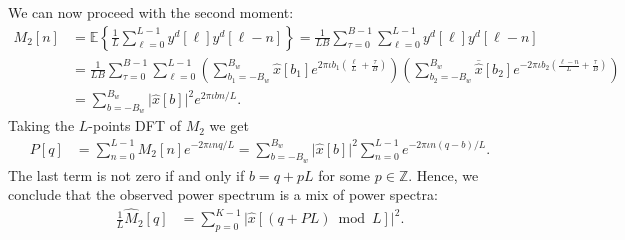\documentclass[english,12pt]{article}
\newcommand{\I}{\iota}
\newcommand{\tB}{B_w}
\newcommand{\hx}{\hat{x}}
\newcommand{\E}{\mathbb{E}}
\numberwithin{equation}{section}
\numberwithin{thm}{section} %
\begin{document}
We can now proceed with the second moment:
\begin{equation} \label{eq:ps}
\begin{split}
M_2[n] &= \E\left\{\frac{1}{L}\sum_{\ell=0}^{L-1} y^d[\ell]y^d[\ell-n]\right\} =  \frac{1}{LB}\sum_{\tau=0}^{B-1}\sum_{\ell=0}^{L-1} y^d[\ell]y^d[\ell-n] \\ &=  \frac{1}{LB}\sum_{\tau=0}^{B-1}\sum_{\ell=0}^{L-1}
\left(\sum_{b_1=-\tB}^{\tB}\hat{x}[b_1]e^{2\pi\I b_1 \left(\frac{\ell}{L} + \frac{\tau}{B}\right)} \right)
\left(\sum_{b_2=-\tB}^{\tB}\overline{\hx}[b_2]e^{-2\pi\I b_2 \left(\frac{\ell-n}{L} + \frac{\tau}{B}\right)} \right) \\
&=
\sum_{b=-\tB}^{\tB}\vert \hat{x}[b]\vert ^2e^{2\pi\I bn/L}.
\end{split}
\end{equation}
Taking the $L$-points DFT of $M_2$ we get 
\begin{equation}
\begin{split}
P[q] &= \sum_{n=0}^{L-1}M_2[n]e^{-2\pi\I nq/L} = \sum_{b=-\tB}^{\tB}\vert \hat{x}[b]\vert^2\sum_{n=0}^{L-1}e^{-2\pi\I n(q-b)/L}.
\end{split}
\end{equation}
The last term is not zero if and only if $b = q + pL$ for some $p\in\mathbb{Z}$.  Hence, we conclude that the observed power spectrum is a mix of power spectra:
\begin{equation}
\begin{split}
\frac{1}{L}\hat{M}_2[q] &=  \sum_{p=0}^{K-1} \vert \hat{x}[(q+PL)\bmod L]\vert^2.
\end{split}
\end{equation}
\end{document}
